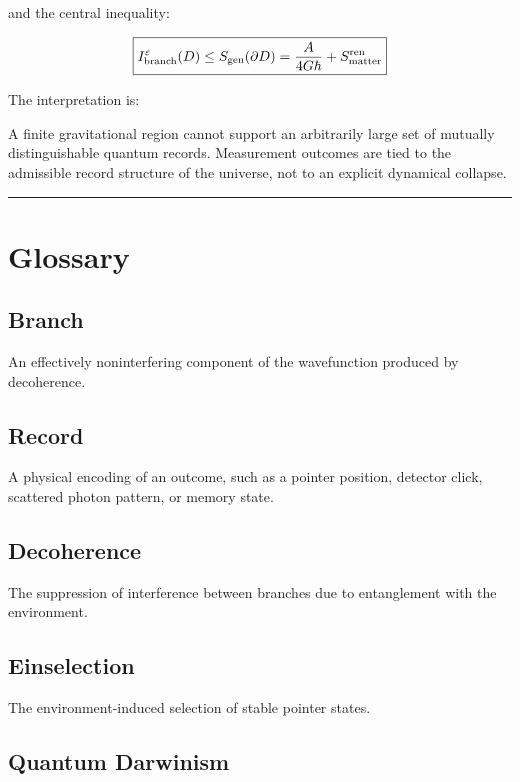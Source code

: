 \documentclass[11pt,a4paper]{article}
\newenvironment{qiqtquote}{\begin{mdframed}[style=quotestyle]}{\end{mdframed}}
\begin{document}
and the central inequality:

\[
\boxed{
I_{\rm branch}^{\varepsilon}(D)
\leq
S_{\rm gen}(\partial D)
=
\frac{A}{4G\hbar}
+
S_{\rm matter}^{\rm ren}
}
\]

The interpretation is:

\begin{qiqtquote}
A finite gravitational region cannot support an arbitrarily large set of mutually distinguishable quantum records. Measurement outcomes are tied to the admissible record structure of the universe, not to an explicit dynamical collapse.
\end{qiqtquote}

\medskip\hrule\medskip

\section{Glossary}

\subsection{Branch}

An effectively noninterfering component of the wavefunction produced by decoherence.

\subsection{Record}

A physical encoding of an outcome, such as a pointer position, detector click, scattered photon pattern, or memory state.

\subsection{Decoherence}

The suppression of interference between branches due to entanglement with the environment.

\subsection{Einselection}

The environment-induced selection of stable pointer states.

\subsection{Quantum Darwinism}
\end{document}
